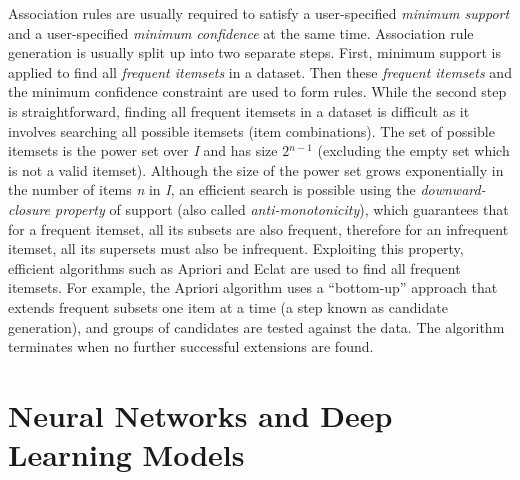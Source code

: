 Association rules are usually required to satisfy a user-specified \textit{minimum support} and a user-specified \textit{minimum confidence} at the same time. Association rule generation is usually split up into two separate steps. First, minimum support is applied to find all \textit{frequent itemsets} in a dataset. Then these \textit{frequent itemsets} and the minimum confidence constraint are used to form rules. While the second step is straightforward, finding all frequent itemsets in a dataset is difficult as it involves searching all possible itemsets (item combinations). The set of possible itemsets is the power set over \textit{I} and has size $2{}^{n-1}$ (excluding the empty set which is not a valid itemset). Although the size of the power set grows exponentially in the number of items \textit{n} in \textit{I}, an efficient search is possible using the \textit{downward-closure property} of support (also called \textit{anti-monotonicity}), which guarantees that for a frequent \hbox{itemset,} all its subsets are also frequent, therefore for an infrequent itemset, all its supersets must also be infrequent. Exploiting this property, efficient algorithms such as Apriori and Eclat are used to find all frequent itemsets. For example, the Apriori algorithm uses a ``bottom-up'' approach that extends frequent subsets one item at a time (a step known as candidate generation), and groups of candidates are tested against the data. The algorithm terminates when no further successful extensions are found.

\section{\label{sec:4.5}Neural Networks and Deep Learning Models}

